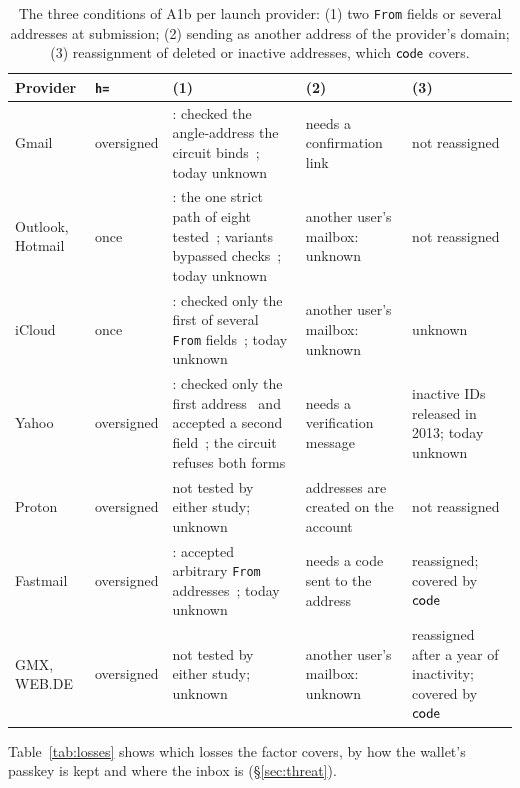\begin{table}[h]
  \caption{The three conditions of A1b per launch provider: (1) two
    \texttt{From} fields or several addresses at submission; (2) sending as
    another address of the provider's domain; (3) reassignment of deleted or
    inactive addresses, which $\mathsf{code}$ covers.}
  \label{tab:providers}
  \small
  \begin{tabularx}{\textwidth}{@{}>{\raggedright\arraybackslash}p{}>{\raggedright\arraybackslash}p{}>{\raggedright\arraybackslash}X>{\raggedright\arraybackslash}p{}>{\raggedright\arraybackslash}p{}@{}}
    \toprule
    Provider & \texttt{h=} & (1) & (2) & (3) \\
    \midrule
    Gmail & oversigned & 2020: checked the angle-address the circuit binds~\cite{chen-composition-kills}; today unknown & needs a confirmation link & not reassigned \\
    Outlook, Hotmail & once & 2020: the one strict path of eight tested~\cite{chen-composition-kills}; variants bypassed checks~\cite{shen-weak-links}; today unknown & another user's mailbox: unknown & not reassigned \\
    iCloud & once & 2020: checked only the first of several \texttt{From} fields~\cite{chen-composition-kills}; today unknown & another user's mailbox: unknown & unknown \\
    Yahoo & oversigned & 2020: checked only the first address~\cite{chen-composition-kills} and accepted a second field~\cite{shen-weak-links}; the circuit refuses both forms & needs a verification message & inactive IDs released in 2013; today unknown \\
    Proton & oversigned & not tested by either study; unknown & addresses are created on the account & not reassigned \\
    Fastmail & oversigned & 2020: accepted arbitrary \texttt{From} addresses~\cite{chen-composition-kills}; today unknown & needs a code sent to the address & reassigned; covered by $\mathsf{code}$ \\
    GMX, WEB.DE & oversigned & not tested by either study; unknown & another user's mailbox: unknown & reassigned after a year of inactivity; covered by $\mathsf{code}$ \\
    \bottomrule
  \end{tabularx}
\end{table}

Table~\ref{tab:losses} shows which losses the factor covers, by how the
wallet's passkey is kept and where the inbox is (\S\ref{sec:threat}).

